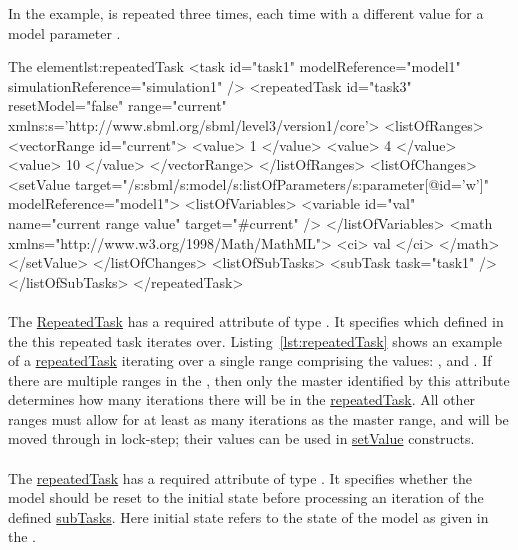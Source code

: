 In the example,  is repeated three times, each time with a different value for a model parameter .
\begin{myXmlLst}{The  element}{lst:repeatedTask}
<task id="task1" modelReference="model1" simulationReference="simulation1" />
<repeatedTask id="task3" resetModel="false" range="current"
    xmlns:s='http://www.sbml.org/sbml/level3/version1/core'>
  <listOfRanges>
    <vectorRange id="current"> 
        <value> 1 </value> 
        <value> 4 </value> 
        <value> 10 </value> 
    </vectorRange> 
  </listOfRanges>
  <listOfChanges>
     <setValue target="/s:sbml/s:model/s:listOfParameters/s:parameter[@id='w']" modelReference="model1">
       <listOfVariables> 
         <variable id="val" name="current range value" target="#current" /> 
       </listOfVariables> 
       <math xmlns="http://www.w3.org/1998/Math/MathML"> 
         <ci> val </ci> 
       </math> 
     </setValue> 
  </listOfChanges>
  <listOfSubTasks>
    <subTask task="task1" />
  </listOfSubTasks>
</repeatedTask>
\end{myXmlLst}
 
\paragraph*{}
\label{sec:rangeAttribute}
The \hyperref[class:repeatedTask]{RepeatedTask} has a required attribute  of type \hyperref[type:sidref]{}. It specifies which  defined in the \hyperref[sec:listOfRanges]{} this repeated task iterates over. Listing~\ref{lst:repeatedTask} shows an example of a \hyperref[class:repeatedTask]{repeatedTask} iterating over a single range comprising the values: ,  and .
If there are multiple ranges in the \hyperref[sec:listOfRanges]{}, then only the master  identified by this attribute determines how many iterations there will be in the \hyperref[class:repeatedTask]{repeatedTask}. All other ranges must allow for at least as many iterations as the master range, and will be moved through in lock-step; their values can be used in \hyperref[class:setValue]{setValue} constructs.

\paragraph*{}
\label{sec:resetModel}
The \hyperref[class:repeatedTask]{repeatedTask} has a required attribute  of type . It specifies whether the model should be reset to the initial state before processing an iteration of the defined \hyperref[class:subTask]{subTasks}. Here initial state refers to the state of the model as given in the \hyperref[sec:listOfModels]{}.

